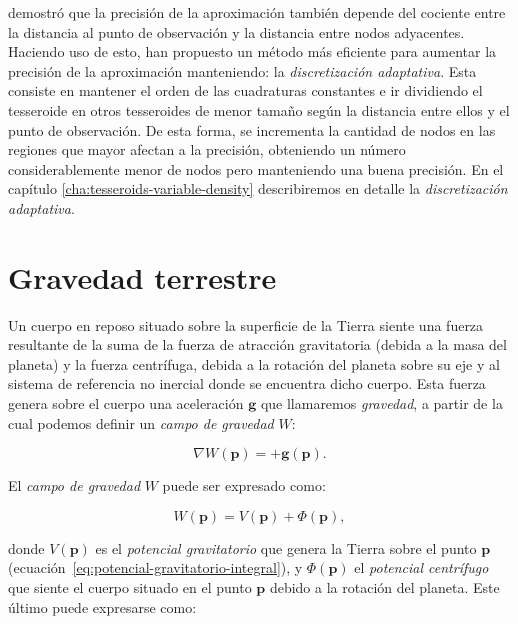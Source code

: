 \citet{ku1977} demostró que la precisión de la aproximación también depende del
cociente entre la distancia al punto de observación y la distancia entre nodos
adyacentes.
Haciendo uso de esto, \citet{li2011} han propuesto un método más eficiente para
aumentar la precisión de la aproximación manteniendo: la \emph{discretización
adaptativa}.
Esta consiste en mantener el orden de las cuadraturas constantes e ir
dividiendo el tesseroide en otros tesseroides de menor tamaño según la
distancia entre ellos y el punto de observación.
De esta forma, se incrementa la cantidad de nodos en las regiones que mayor
afectan a la precisión, obteniendo un número considerablemente menor de nodos
pero manteniendo una buena precisión.
En el capítulo \ref{cha:tesseroids-variable-density} describiremos en detalle
la \emph{discretización adaptativa}.



\section{Gravedad terrestre}
\label{sec:gravedad-terrestre}

Un cuerpo en reposo situado sobre la superficie de la Tierra siente una fuerza
resultante de la suma de la fuerza de atracción gravitatoria (debida a la masa
del planeta) y la fuerza centrífuga, debida a la rotación del planeta sobre su
eje y al sistema de referencia no inercial donde se encuentra dicho
cuerpo.
Esta fuerza genera sobre el cuerpo una aceleración $\mathbf{g}$ que
llamaremos \emph{gravedad}, a partir de la cual podemos definir un
\emph{campo de gravedad} $W$:

\begin{equation}
    \nabla W(\mathbf{p}) = +\mathbf{g}(\mathbf{p}).
    \label{eq:campo-gravedad-terrestre}
\end{equation}

El \emph{campo de gravedad} $W$ puede ser expresado como:

\begin{equation}
    W(\mathbf{p}) = V(\mathbf{p}) + \Phi(\mathbf{p}),
\end{equation}

\noindent donde $V(\mathbf{p})$ es el \emph{potencial gravitatorio} que genera
la Tierra sobre el punto $\mathbf{p}$
(ecuación~\ref{eq:potencial-gravitatorio-integral}), y $\Phi(\mathbf{p})$ el
\emph{potencial centrífugo} que siente el cuerpo situado en el punto
$\mathbf{p}$ debido a la rotación del planeta.
Este último puede expresarse como:

